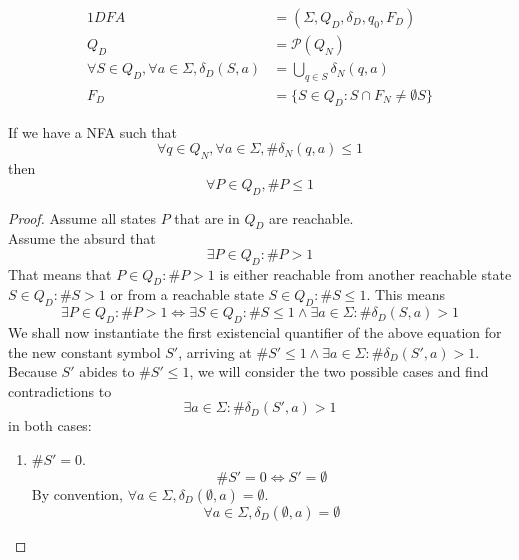 \documentclass[docid=TP03]{tcom_TP}
\begin{document}
{\begin{alignat}{1}
	DFA &= (\Sigma, Q_D, \delta_D, {q_0}, F_D)\\
	Q_D &= \mathscr{P}(Q_N)\\
	\forall S \in Q_D, \forall a \in \Sigma, \delta_D(S,a)&=\bigcup_{q\in S}{\delta_N(q,a)} \label{eq:NFA_DFA_trans}\\
	F_D &= \{S\in Q_D: S \cap F_N \neq \emptyset S\}
\end{alignat}
\begin{lemma} \label{lem:NFA_DFA}
	If we have a NFA such that
	\begin{equation}
	\label{lem:NFA}
		\forall q \in Q_N, \forall a \in \Sigma, \#\delta_N(q,a)\leq 1
	\end{equation}
	then
	\begin{equation}
		\forall P \in Q_D, \#P \leq 1
	\end{equation}
\end{lemma}
\begin{proof}
	Assume all states $P$ that are in $Q_D$ are reachable.\\
	Assume the absurd that
	\begin{equation} \label{eq:absurd_NFA}
		\exists P \in Q_D\colon\#P > 1
	\end{equation}
	That means that $P\in Q_D \colon \#P > 1$ is either reachable from another reachable state $S\in Q_D\colon\#S>1$ or from a reachable state $S\in Q_D\colon\#S\leq 1$. This means
	\begin{equation}
		\exists P \in Q_D\colon\#P>1
		\iff \exists S \in Q_D\colon \#S\leq 1 \wedge \exists a \in \Sigma\colon \#\delta_D(S,a)>1
	\end{equation}
	We shall now instantiate the first existencial quantifier of the above equation for the new constant symbol $S'$, arriving at $\#S'\leq 1 \wedge \exists a \in \Sigma\colon \#\delta_D(S',a)>1$. Because $S'$ abides to $\#S'\leq 1$, we will consider the two possible cases and find contradictions 
to
	\begin{equation} \label{eq:absurd_NFA_2}
		\exists a \in \Sigma\colon \#\delta_D(S',a)>1
	\end{equation}
	in both cases:
	\begin{enumerate}
		\item $\#S'=0$.
			\begin{equation}
				\#S'=0 \iff S'=\emptyset
			\end{equation}
			By convention, $\forall a \in \Sigma, \delta_D(\emptyset,a)=\emptyset$.
			\begin{equation}
				\forall a \in \Sigma, \delta_D(\emptyset,a)=\emptyset

\end{equation}
\end{enumerate}
\end{proof}}
\end{document}
